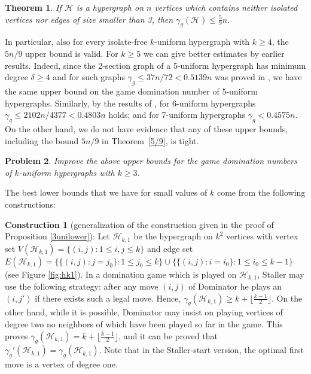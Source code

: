 \documentclass[12pt]{article}
\newtheorem{theorem}{Theorem}[section]
\newtheorem{problem}[theorem]{Problem}
\newcommand\cH{{\mathcal H}}
\begin{document}
\begin{theorem} \label{5/9-gen}
If $\cH$ is a hypergraph on $n$ vertices which contains neither isolated vertices nor edges of size smaller than 3, then
$\gamma_g(\cH)\le \frac{5}{9}n.$
\end{theorem}

In particular, also for every isolate-free $k$-uniform hypergraph with $k \ge 4$, the $5n/9$ upper bound is valid. For $k\ge 5$ we can give better estimates by earlier results. Indeed, since  the 2-section graph of a 5-uniform hypergraph has minimum degree $\delta\ge 4$ and for such graphs $\gamma_g \le 37n/72 < 0.5139 n$ was proved in \cite{B2}, we have the same upper bound on the game domination number of 5-uniform hypergraphs. Similarly, by the results of \cite{B2}, for 6-uniform hypergraphs $\gamma_g \le 2102n/4377 < 0.4803 n$ holds; and for 7-uniform hypergraphs  $\gamma_g < 0.4575 n$. On the other hand, we do not have evidence that any of these upper bounds, including the bound $5n/9$ in Theorem~\ref{5/9}, is tight. 

\begin{problem} Improve the above upper bounds for the game domination numbers of $k$-uniform hypergraphs with $k \ge 3$.
\end{problem}


The best lower bounds that we have for small values of $k$ come from the following constructions:

\vspace{2mm}

\noindent
\textbf{Construction 1} (generalization of the construction given in the proof of Proposition \ref{3unilower}): Let $\cH_{k,1}$ be the hypergraph on $k^2$ vertices with vertex set $V(\cH_{k,1})=\{(i,j):1\le i,j\le k\}$ and edge set $E(\cH_{k,1})=\{\{(i,j):j=j_0\}:1\le j_0\le k\}\cup \{\{(i,j):i=i_0\}:1\le i_0\le k-1\}$ (see Figure \ref{fig:hk1}). In a domination game which is played on $\cH_{k,1}$, Staller may use the following strategy: after any move $(i,j)$ of Dominator he plays an $(i,j')$ if there exists such a legal move. Hence, $\gamma_g(\cH_{k,1})\ge k+ \lfloor\frac{k-1}{2}\rfloor$. On the other hand, while it is possible, Dominator may insist on playing vertices of degree two  no neighbors of which have been played so far in the game. This proves $\gamma_g(\cH_{k,1})= k+ \lfloor\frac{k-1}{2}\rfloor$, and it can be proved that $\gamma_g'(\cH_{k,1})=\gamma_g(\cH_{k,1})$. Note that in the Staller-start version, the optimal first move is a vertex of degree one.
\end{document}
